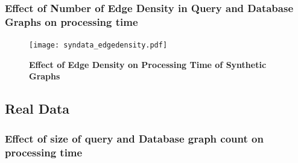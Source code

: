 \subsubsection{Effect of Number of Edge Density in Query and Database Graphs on processing time}

\begin{figure}[H]
\centering
\texttt{[image: syndata\_edgedensity.pdf]}
\caption{\textbf{Effect of Edge Density on Processing Time of Synthetic Graphs}} 
\label{fig:edgedensity}
\end{figure}





\subsection{Real Data}

\subsubsection{Effect of size of query and Database graph count on processing time}


